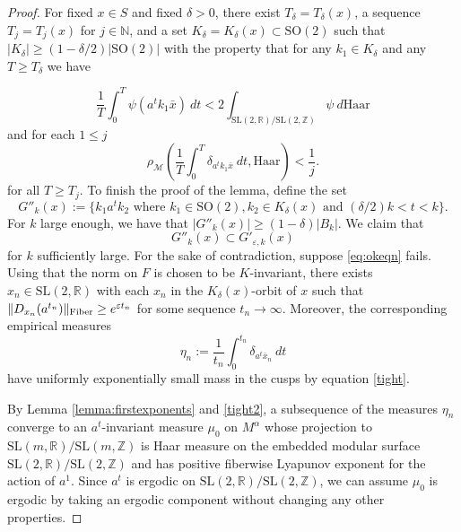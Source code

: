 \documentclass[10pt,reqno]{amsart}
\theoremstyle{Theorem}
\theoremstyle{definition}
\theoremstyle{remark}
\newcommand{\note}[1]{\marginpar{{\color{red}\footnotesize \begin{spacing}{1}#1\end{spacing}}}}
\renewcommand{\epsilon}{\varepsilon}
\newcommand{\R}{\mathbb {R}}
\newcommand{\Z}{\mathbb {Z}}
\newcommand{\N}{\mathbb {N}}
\newcommand{\e}{\epsilon}
\newcommand{\Sl}{\mathrm{SL}}
\newcommand{\So}{\mathrm{SO}}
\def\calM{\mathcal M}
\begin{document}
\begin{proof}
For fixed $x\in S$ and fixed $\delta>0$,  there exist   $T_{\delta}= T_\delta(x)$, a sequence $T_j = T_j (x)$ for $j\in \N$,  and a set $K_{\delta} = K_\delta(x) \subset \So(2)$ such that  $|K_{\delta}| \geq (1-\delta/2)|\So(2)|$ with the property that  for any $k_1 \in K_ {\delta}$ and any $T \geq T_{\delta}$ we have

\begin{equation}\label{tight}
\frac{1}{T} \int_{0}^T \psi(a^tk_1\bar{x}) \ dt < 2\int_{\Sl(2,\R)/\Sl(2,\Z)} \psi \ d\text{Haar}
\end{equation}
and for each $1\le j$
\begin{equation}\label{tight2}
\rho_\calM \left(\frac{1}{T} \int_{0}^{T}  \delta_{a^tk_1\bar{x}}  \ dt, \text{Haar}\right)< \frac{1}{j}.
\end{equation}
\noindent for all $T \geq T_j$.
 To finish the proof of the lemma, define the set $$G''_{k}(x) := \{   k_1a^tk_2 \text{ where } k_1 \in \So(2), k_2 \in K_{\delta}(x) \text{ and } (\delta/2) k <t < k\}.$$
 For $k$ large enough, we have that  $|G''_{k}(x)| \geq (1- \delta)|B_k|$.
   We claim   that \begin{equation}\label{eq:okeqn}G''_{k}(x) \subset G'_{\e,k}(x)\end{equation} for $k$ sufficiently large.     For the sake of contradiction, suppose \eqref{eq:okeqn} fails.  Using that the norm on $F$ is chosen to be $K$-invariant, there exists  $x_n \in \Sl(2,\R)$ with each $x_n $ in the  $K_\delta(x)$-orbit of $x$ such that $\|D_{x_n}(a^{t_n})\|_\fib \geq e^{\e t_n}$ for some sequence $t_n \to \infty$.  Moreover, the corresponding {empirical measures} $$\eta_n:=\frac{1}{t_n} \int_{0}^{t_n}  \delta_{a^t\bar{x}_n}  \ dt$$ have uniformly exponentially small mass in the cusps by equation \eqref{tight}.%



By Lemma \ref{lemma:firstexponents} and  \eqref{tight2}, a subsequence of the measures $\eta_n$ converge to an $a^t$-invariant measure $\mu_0$ on $M^{\alpha}$  whose projection to $\Sl(m, \R)/\Sl(m,\Z)$ is Haar measure on the embedded modular surface $\Sl(2,\R)/\Sl(2, \Z)$ and has positive fiberwise Lyapunov exponent for the action of $a^1$. %
Since $a^t$ is ergodic on   $\Sl(2,\R)/\Sl(2, \Z)$, we can assume $\mu_0$ is ergodic by taking an ergodic component without changing any other properties.


\end{proof}
\end{document}
